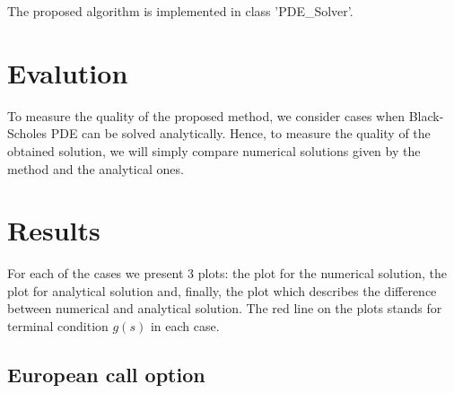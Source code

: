 \documentclass[11pt,a4paper]{extarticle}
\begin{document}
The proposed algorithm is implemented in class 'PDE\_Solver'.

\section{Evalution}

To measure the quality of the proposed method, we consider cases when Black-Scholes PDE can be solved analytically. Hence, to measure the quality of the obtained solution, we will simply compare numerical solutions given by the method and the analytical ones.

\section{Results}

For each of the cases we present 3 plots: the plot for the numerical solution, the plot for analytical solution and, finally, the plot which describes the difference between numerical and analytical solution. The red line on the plots stands for terminal condition $g(s)$ in each case.

\subsection{European call option}
\end{document}
